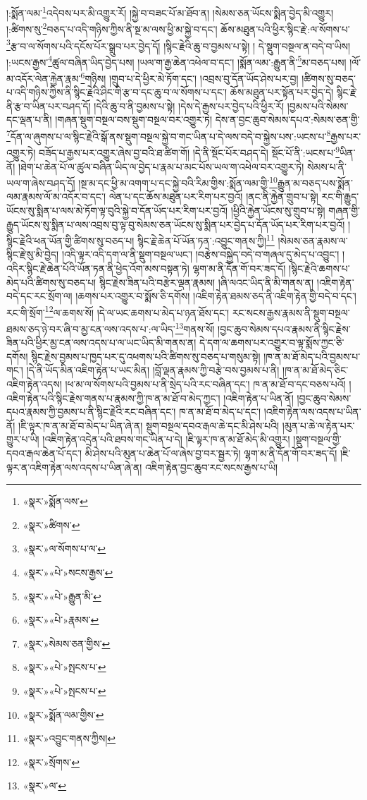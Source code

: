 །:སྨོན་ལམ་\footnote{«སྣར་»སྨོན་ལས་}འདེབས་པར་མི་འགྱུར་རོ། །སྐྱེ་བ་བཟང་པོ་མ་ཐོབ་ན། །སེམས་ཅན་ཡོངས་སྨིན་བྱེད་མི་འགྱུར། །:ཚིགས་སུ་\footnote{«སྣར་»ཚིགས་}བཅད་པ་འདི་གཉིས་ཀྱིས་ནི་སྔ་མ་ལས་ཕྱི་མ་སྐྱེ་བ་དང་། ཆོས་མཐུན་པའི་ཕྱིར་སྙིང་རྗེ་:ལ་སོགས་པ་\footnote{«སྣར་»ལ་སོགས་པ་ལ་}རྩ་བ་ལ་སོགས་པའི་དངོས་པོར་སྒྲུབ་པར་བྱེད་དོ། །སྙིང་རྗེའི་ཆུ་བ་བྱམས་པ་སྟེ། །
དེ་སྡུག་བསྔལ་ན་བདེ་བ་ཡིས། །:ཡངས་རྒྱས་\footnote{«སྣར་»«པེ་»སངས་རྒྱས་}ཚུལ་བཞིན་ཡིད་བྱེད་པས། །ཡལ་ག་རྒྱ་ཆེན་འཕེལ་བ་དང་། །སྨོན་ལམ་:རྒྱུན་ནི་\footnote{«སྣར་»«པེ་»རྒྱུན་མི་}མ་བཅད་པས། །ལོ་མ་འདོར་ལེན་རྐྱེན་རྣམ་\footnote{«སྣར་»«པེ་»རྣམས་}གཉིས། །གྲུབ་པ་དེ་ཕྱིར་མེ་ཏོག་དང་། །འབྲས་བུ་དོན་ཡོད་ཤེས་པར་བྱ། །ཚིགས་སུ་བཅད་པ་འདི་གཉིས་ཀྱིས་ནི་སྙིང་རྗེའི་ཤིང་གི་རྩ་བ་དང་ཆུ་བ་ལ་སོགས་པ་དང་། ཆོས་མཐུན་པར་སྟོན་པར་བྱེད་དེ། སྙིང་རྗེ་ནི་རྩ་བ་ཡིན་པར་བཤད་དོ། །དེའི་ཆུ་བ་ནི་བྱམས་པ་སྟེ། །དེས་དེ་རྒྱས་པར་བྱེད་པའི་ཕྱིར་རོ། །བྱམས་པའི་སེམས་དང་ལྡན་པ་ནི། །གཞན་སྡུག་བསྔལ་བས་སྡུག་བསྔལ་བར་འགྱུར་ཏེ། དེས་ན་བྱང་ཆུབ་སེམས་དཔའ་:སེམས་ཅན་གྱི་\footnote{«སྣར་»སེམས་ཅན་གྱིས་}དོན་ལ་ཞུགས་པ་ལ་སྙིང་རྗེའི་སྒོ་ནས་སྡུག་བསྔལ་སྐྱེ་བ་གང་ཡིན་པ་དེ་ལས་བདེ་བ་སྐྱེས་པས་:ཡངས་པ་\footnote{«སྣར་»«པེ་»སྤངས་པ་}རྒྱས་པར་འགྱུར་ཏེ། བཟོད་པ་རྒྱས་པར་འགྱུར་ཞེས་བྱ་བའི་ཐ་ཚིག་གོ། །དེ་ནི་སྡོང་པོར་བཤད་དེ། སྡོང་པོ་ནི་:ཡངས་པ་\footnote{«སྣར་»«པེ་»སྤངས་པ་}ཡིན་ནོ། །ཐེག་པ་ཆེན་པོ་ལ་ཚུལ་བཞིན་ཡིད་ལ་བྱེད་པ་རྣམ་པ་མང་པོས་ཡལ་ག་འཕེལ་བར་འགྱུར་ཏེ། སེམས་པ་ནི་ཡལ་ག་ཞེས་བཤད་དོ། །སྔ་མ་དང་ཕྱི་མ་འགག་པ་དང་སྐྱེ་བའི་རིམ་གྱིས་:སྨོན་ལམ་གྱི་\footnote{«སྣར་»སྨོན་ལམ་གྱིས་}རྒྱུན་མ་བཅད་པས་སྨོན་ལམ་རྣམས་ལོ་མ་འདོར་བ་དང་། ལེན་པ་དང་ཆོས་མཐུན་པར་རིག་པར་བྱའོ། །ནང་ནི་རྐྱེན་གྲུབ་པ་སྟེ། རང་གི་རྒྱུད་ཡོངས་སུ་སྨིན་པ་ལས་མེ་ཏོག་ལྟ་བུའི་སྐྱེ་བ་དོན་ཡོད་པར་རིག་པར་བྱའོ། །ཕྱིའི་རྐྱེན་ཡོངས་སུ་གྲུབ་པ་སྟེ། གཞན་གྱི་རྒྱུད་ཡོངས་སུ་སྨིན་པ་ལས་འབྲས་བུ་ལྟ་བུ་སེམས་ཅན་ཡོངས་སུ་སྨིན་པར་བྱེད་པ་དོན་ཡོད་པར་རིག་པར་བྱའོ། །སྙིང་རྗེའི་ཕན་ཡོན་གྱི་ཚིགས་སུ་བཅད་པ། སྙིང་རྗེ་ཆེན་པོ་ཡོན་ཏན་:འབྱུང་གནས་ཀྱི།\footnote{«སྣར་»འབྱུང་གནས་ཀྱིས།} །སེམས་ཅན་རྣམས་ལ་སྙིང་རྗེ་སུ་མི་བྱེད། །འདི་ལྟར་འདི་དག་ལ་ནི་སྡུག་བསྔལ་ཡང་། །བརྩེས་བསྐྱེད་བདེ་བ་གཞལ་དུ་མེད་པ་འབྱུང་། །འདིར་སྙིང་རྗེ་ཆེན་པོའི་ཡོན་ཏན་ནི་ཕྱེད་འོག་མས་བསྟན་ཏེ། ལྷག་མ་ནི་དོན་གོ་བར་ཟད་དོ། །སྙིང་རྗེའི་ཆགས་པ་མེད་པའི་ཚིགས་སུ་བཅད་པ། སྙིང་རྗེས་ཟིན་པའི་བརྩེར་ལྡན་རྣམས། །ཞི་ལའང་ཡིད་ནི་མི་གནས་ན། །འཇིག་རྟེན་བདེ་དང་རང་སྲོག་ལ། །ཆགས་པར་འགྱུར་བ་སྨོས་ཅི་དགོས། །འཇིག་རྟེན་ཐམས་ཅད་ནི་འཇིག་རྟེན་གྱི་བདེ་བ་དང་། རང་གི་སྲོག་\footnote{«སྣར་»སྲོགས་}ལ་ཆགས་སོ། །དེ་ལ་ཡང་ཆགས་པ་མེད་པ་ཉན་ཐོས་དང་། རང་སངས་རྒྱས་རྣམས་ནི་སྡུག་བསྔལ་ཐམས་ཅད་ཉེ་བར་ཞི་བ་མྱ་ངན་ལས་འདས་པ་:ལ་ཡིད་\footnote{«སྣར་»ལ་}གནས་སོ། །བྱང་ཆུབ་སེམས་དཔའ་རྣམས་ནི་སྙིང་རྗེས་ཟིན་པའི་ཕྱིར་མྱ་ངན་ལས་འདས་པ་ལ་ཡང་ཡིད་མི་གནས་ན། དེ་དག་ལ་ཆགས་པར་འགྱུར་བ་ལྟ་སྨོས་ཀྱང་ཅི་དགོས། སྙིང་རྗེས་བྱམས་པ་ཁྱད་པར་དུ་འཕགས་པའི་ཚིགས་སུ་བཅད་པ་གསུམ་སྟེ། །ཁ་ན་མ་ཐོ་མེད་པའི་བྱམས་པ་གང་། །དེ་ནི་ཡོད་མིན་འཇིག་རྟེན་པ་ཡང་མིན། །བློ་ལྡན་རྣམས་ཀྱི་བརྩེ་བས་བྱམས་པ་ནི། །ཁ་ན་མ་ཐོ་མེད་ཅིང་འཇིག་རྟེན་འདས། །ཕ་མ་ལ་སོགས་པའི་བྱམས་པ་ནི་སྲེད་པའི་རང་བཞིན་དང་། ཁ་ན་མ་ཐོ་བ་དང་བཅས་པའོ། །འཇིག་རྟེན་པའི་སྙིང་རྗེས་གནས་པ་རྣམས་ཀྱི་ཁ་ན་མ་ཐོ་བ་མེད་ཀྱང་། །འཇིག་རྟེན་པ་ཡིན་ནོ། །བྱང་ཆུབ་སེམས་དཔའ་རྣམས་ཀྱི་བྱམས་པ་ནི་སྙིང་རྗེའི་རང་བཞིན་དང་། ཁ་ན་མ་ཐོ་བ་མེད་པ་དང་། །འཇིག་རྟེན་ལས་འདས་པ་ཡིན་ནོ། །ཇི་ལྟར་ཁ་ན་མ་ཐོ་བ་མེད་པ་ཡིན་ཞེ་ན། སྡུག་བསྔལ་དབའ་རྒལ་ཆེ་དང་མི་ཤེས་པའི། །མུན་པ་ཆེ་ལ་རྟེན་པར་གྱུར་པ་ཡི། །འཇིག་རྟེན་འདྲེན་པའི་ཐབས་གང་ཡིན་པ་དེ། །ཇི་ལྟར་ཁ་ན་མ་ཐོ་མེད་མི་འགྱུར། །སྡུག་བསྔལ་གྱི་དབའ་རྒལ་ཆེན་པོ་དང་། མི་ཤེས་པའི་མུན་པ་ཆེན་པོ་ལ་ཞེས་བྱ་བར་སྦྱར་ཏེ། ལྷག་མ་ནི་དོན་གོ་བར་ཟད་དོ། །ཇི་ལྟར་ན་འཇིག་རྟེན་ལས་འདས་པ་ཡིན་ཞེ་ན། འཇིག་རྟེན་བྱང་ཆུབ་རང་སངས་རྒྱས་པ་ཡི། 